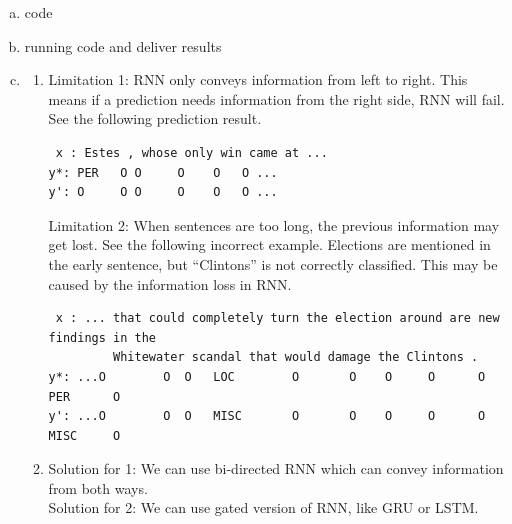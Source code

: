 \documentclass[11pt, oneside]{article}      %
\newcommand{\hasPageBreak}{}
\begin{document}
\begin{enumerate}   [(a)]
\item code
\item running code and deliver results
\item 
\begin{enumerate}   [i]
\item
 Limitation 1: RNN only conveys information from left to right. This means if a prediction needs information from the right side, RNN will fail. See the following prediction result.
\begin{verbatim}
 x : Estes , whose only win came at ...
y*: PER   O O     O    O   O ...
y': O     O O     O    O   O ...
\end{verbatim}
 Limitation 2: When sentences are too long, the previous information may get lost. See the following incorrect example. Elections are mentioned in the early sentence, but ``Clintons'' is not correctly classified. This may be caused by the information loss in RNN.
 \begin{verbatim}
 x : ... that could completely turn the election around are new findings in the 
         Whitewater scandal that would damage the Clintons . 
y*: ...O        O  O   LOC        O       O    O     O      O   PER      O 
y': ...O        O  O   MISC       O       O    O     O      O   MISC     O 	
 \end{verbatim}

 \item Solution for 1: We can use bi-directed RNN which can convey information from both ways. \\
Solution for 2: We can use gated version of RNN, like GRU or LSTM.
\end{enumerate}

\end{enumerate}




\hasPageBreak
\end{document}
